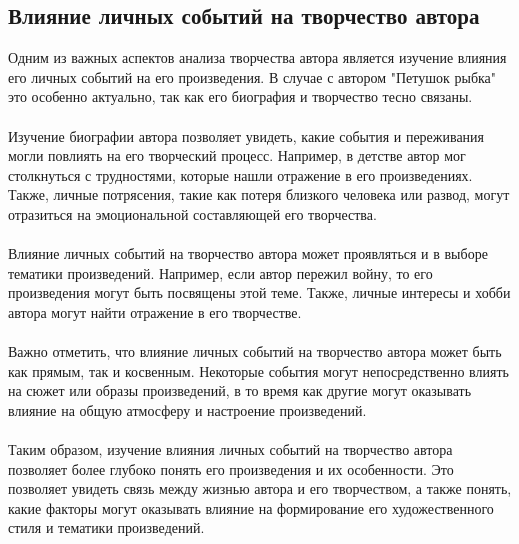 \documentclass{article}
\begin{document}
\subsection{Влияние личных событий на творчество автора}
Одним из важных аспектов анализа творчества автора является изучение влияния его личных событий на его произведения. В случае с автором "{}{}Петушок рыбка"{}{} это особенно актуально, так как его биография и творчество тесно связаны.\\
~\\
Изучение биографии автора позволяет увидеть, какие события и переживания могли повлиять на его творческий процесс. Например, в детстве автор мог столкнуться с трудностями, которые нашли отражение в его произведениях. Также, личные потрясения, такие как потеря близкого человека или развод, могут отразиться на эмоциональной составляющей его творчества.\\
~\\
Влияние личных событий на творчество автора может проявляться и в выборе тематики произведений. Например, если автор пережил войну, то его произведения могут быть посвящены этой теме. Также, личные интересы и хобби автора могут найти отражение в его творчестве.\\
~\\
Важно отметить, что влияние личных событий на творчество автора может быть как прямым, так и косвенным. Некоторые события могут непосредственно влиять на сюжет или образы произведений, в то время как другие могут оказывать влияние на общую атмосферу и настроение произведений.\\
~\\
Таким образом, изучение влияния личных событий на творчество автора позволяет более глубоко понять его произведения и их особенности. Это позволяет увидеть связь между жизнью автора и его творчеством, а также понять, какие факторы могут оказывать влияние на формирование его художественного стиля и тематики произведений.\\
~\\

\newpage
\end{document}
